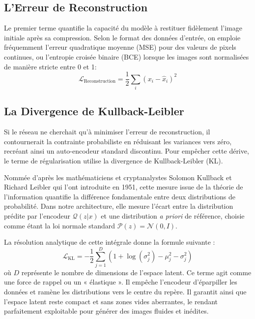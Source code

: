 \documentclass[11pt,a4paper]{report}
\begin{document}
\subsection{L'Erreur de Reconstruction}
Le premier terme quantifie la capacité du modèle à restituer fidèlement l'image initiale après sa compression. Selon le format des données d'entrée, on emploie fréquemment l'erreur quadratique moyenne (MSE) pour des valeurs de pixels continues, ou l'entropie croisée binaire (BCE) lorsque les images sont normalisées de manière stricte entre 0 et 1:
\begin{equation}
    \mathcal{L}_{\text{Reconstruction}} = \frac{1}{2} \sum_{i} (x_i - \hat{x}_i)^2
\end{equation}


\subsection{La Divergence de Kullback-Leibler}
Si le réseau ne cherchait qu'à minimiser l'erreur de reconstruction, il contournerait la contrainte probabiliste en réduisant les variances vers zéro, recréant ainsi un auto-encodeur standard discontinu. Pour empêcher cette dérive, le terme de régularisation utilise la divergence de Kullback-Leibler (KL).

Nommée d'après les mathématiciens et cryptanalystes Solomon Kullback et Richard Leibler qui l'ont introduite en 1951, cette mesure issue de la théorie de l'information quantifie la différence fondamentale entre deux distributions de probabilité. Dans notre architecture, elle mesure l'écart entre la distribution prédite par l'encodeur $\mathcal{Q}(z|x)$ et une distribution \textit{a priori} de référence, choisie comme étant la loi normale standard $\mathcal{P}(z) = \mathcal{N}(0, I)$. 

La résolution analytique de cette intégrale donne la formule suivante :
\begin{equation}
    \mathcal{L}_{\text{KL}} = -\frac{1}{2} \sum_{j=1}^{D} \left( 1 + \log(\sigma_j^2) - \mu_j^2 - \sigma_j^2 \right)
\end{equation}
où $D$ représente le nombre de dimensions de l'espace latent. Ce terme agit comme une force de rappel ou un « élastique ». Il empêche l'encodeur d'éparpiller les données et ramène les distributions vers le centre du repère. Il garantit ainsi que l'espace latent reste compact et sans zones vides aberrantes, le rendant parfaitement exploitable pour générer des images fluides et inédites.
\end{document}
